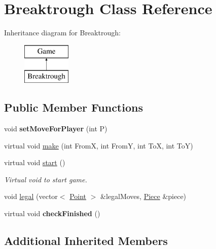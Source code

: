 \hypertarget{class_breaktrough}{\section{Breaktrough Class Reference}
\label{class_breaktrough}
}
Inheritance diagram for Breaktrough\-:\begin{figure}[H]
\begin{center}
\leavevmode
\includegraphics[height=2.000000cm]{class_breaktrough}
\end{center}
\end{figure}
\subsection*{Public Member Functions}
\begin{DoxyCompactItemize}
\item 
\hypertarget{class_breaktrough_a1e1244669a6ab63043329afcdaaeec37}{void {\bfseries set\-Move\-For\-Player} (int P)}\label{class_breaktrough_a1e1244669a6ab63043329afcdaaeec37}

\item 
virtual void \hyperlink{class_breaktrough_a07006aa5d9919ddefa68554f3022afc6}{make} (int From\-X, int From\-Y, int To\-X, int To\-Y)
\item 
virtual void \hyperlink{class_breaktrough_a1e4b2c80e074f7052c4c491abe95c9f6}{start} ()
\begin{DoxyCompactList}\small\item\em Virtual void to start game. \end{DoxyCompactList}\item 
void \hyperlink{class_breaktrough_a6bf5d444ace61244df9a0255fde5d533}{legal} (vector$<$ \hyperlink{struct_point}{Point} $>$ \&legal\-Moves, \hyperlink{class_piece}{Piece} \&piece)
\item 
\hypertarget{class_breaktrough_ae9e5edbac2c2fcce47711697eb3a8a2d}{virtual void {\bfseries check\-Finished} ()}\label{class_breaktrough_ae9e5edbac2c2fcce47711697eb3a8a2d}

\end{DoxyCompactItemize}
\subsection*{Additional Inherited Members}


